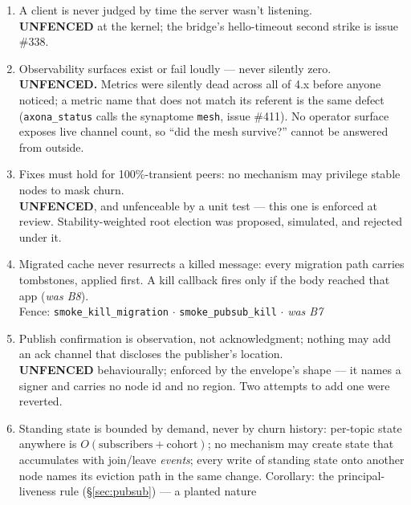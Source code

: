 \documentclass[nobib]{tufte-handout}
\begin{document}
\begin{enumerate}
{  \texttt{smoke\_pubsub\_leave\_handoff} $\cdot$
  \texttt{smoke\_backup\_handoff} $\cdot$
  \texttt{smoke\_handoff\_scaling} (tier order only indirectly ---
  \textbf{partial})}
\item[\textbf{I-5}] A client is never judged by time the server wasn't
  listening.\\
  {\footnotesize\textbf{UNFENCED} at the kernel; the bridge's
  hello-timeout second strike is issue \#338.}
\item[\textbf{I-6}] Observability surfaces exist or fail loudly ---
  never silently zero.\\
  {\footnotesize\textbf{UNFENCED.} Metrics were silently dead across all
  of 4.x before anyone noticed; a metric name that does not match its
  referent is the same defect (\texttt{axona\_status} calls the
  synaptome \texttt{mesh}, issue \#411). No operator surface exposes
  live channel count, so ``did the mesh survive?'' cannot be answered
  from outside.}
\item[\textbf{I-7}] Fixes must hold for 100\%-transient peers: no
  mechanism may privilege stable nodes to mask churn.\\
  {\footnotesize\textbf{UNFENCED}, and unfenceable by a unit test ---
  this one is enforced at review. Stability-weighted root election was
  proposed, simulated, and rejected under it.}
\item[\textbf{I-8}] Migrated cache never resurrects a killed message:
  every migration path carries tombstones, applied first. A kill
  callback fires only if the body reached that app (\emph{was B8}).\\
  {\footnotesize\textsf{Fence:} \texttt{smoke\_kill\_migration} $\cdot$
  \texttt{smoke\_pubsub\_kill} $\cdot$ \emph{was B7}}
\item[\textbf{I-9}] Publish confirmation is observation, not
  acknowledgment; nothing may add an ack channel that discloses the
  publisher's location.\\
  {\footnotesize\textbf{UNFENCED} behaviourally; enforced by the
  envelope's shape --- it names a signer and carries no node id and no
  region. Two attempts to add one were reverted.}
\item[\textbf{I-10}] Standing state is bounded by demand, never by
  churn history: per-topic state anywhere is $O(\mathrm{subscribers} +
  \mathrm{cohort})$; no mechanism may create state that accumulates
  with join/leave \emph{events}; every write of standing state onto
  another node names its eviction path in the same change. Corollary:
  the principal-liveness rule (\S\ref{sec:pubsub}) --- a planted nature

\end{enumerate}
\end{document}
